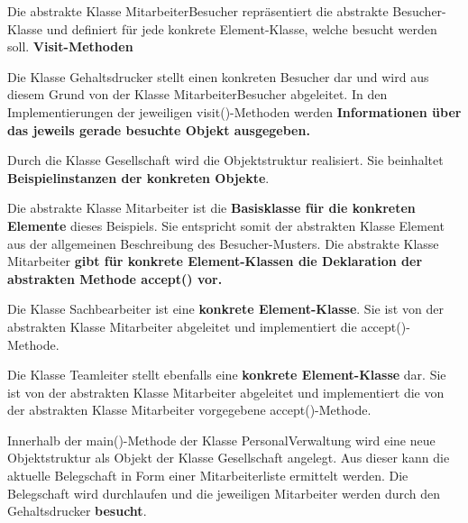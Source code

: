 \documentclass[12pt,a4paper,titlepage]{article}
\theoremstyle{definition}
\begin{document}
Die abstrakte Klasse MitarbeiterBesucher repräsentiert die abstrakte Besucher-Klasse und definiert für jede konkrete Element-Klasse, welche besucht werden soll.
\textbf{Visit-Methoden}


\newpage

Die Klasse Gehaltsdrucker stellt einen konkreten Besucher dar und wird aus diesem Grund von der Klasse MitarbeiterBesucher abgeleitet. 
In den Implementierungen der jeweiligen visit()-Methoden werden \textbf{Informationen über das jeweils gerade besuchte Objekt ausgegeben.}


Durch die Klasse Gesellschaft wird die Objektstruktur realisiert. Sie beinhaltet \\ \textbf{Beispielinstanzen der konkreten Objekte}.


Die abstrakte Klasse Mitarbeiter ist die \textbf{Basisklasse für die konkreten Elemente} dieses Beispiels. Sie entspricht somit der abstrakten Klasse Element aus der allgemeinen Beschreibung des Besucher-Musters. 
Die abstrakte Klasse Mitarbeiter \textbf{gibt für konkrete Element-Klassen die Deklaration der abstrakten Methode accept() vor.}


Die Klasse  Sachbearbeiter ist eine \textbf{konkrete Element-Klasse}. Sie ist von der abstrakten Klasse Mitarbeiter abgeleitet und implementiert die accept()-Methode.


\newpage

Die Klasse Teamleiter stellt ebenfalls eine \textbf{konkrete Element-Klasse} dar. Sie ist von der abstrakten Klasse Mitarbeiter abgeleitet und implementiert die von der abstrakten Klasse Mitarbeiter vorgegebene accept()-Methode.


\newpage

Innerhalb der main()-Methode der Klasse PersonalVerwaltung wird eine neue Objektstruktur als Objekt der Klasse Gesellschaft angelegt. Aus dieser kann die aktuelle Belegschaft in Form einer Mitarbeiterliste ermittelt werden. Die Belegschaft wird durchlaufen und die jeweiligen Mitarbeiter werden durch den Gehaltsdrucker \textbf{besucht}.

\end{document}

